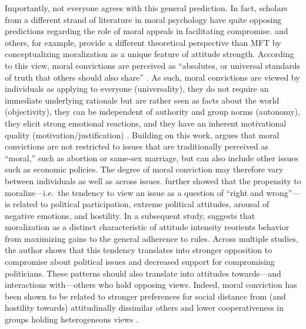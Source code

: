 Importantly, not everyone agrees with this general prediction. In fact, scholars from a different strand of literature in moral psychology have quite opposing predictions regarding the role of moral appeals in facilitating compromise. \citet{skitka2005moral} and others, for example, provide a different theoretical perspective than MFT by conceptualizing moralization as a unique feature of attitude strength. According to this view, moral convictions are perceived as ``absolutes, or universal standards of truth that others should also share'' \citep[269]{skitka2010psychology}. As such, moral convictions are viewed by individuals as applying to everyone (universality), they do not require an immediate underlying rationale but are rather seen as facts about the world (objectivity), they can be independent of authority and group norms (autonomy), they elicit strong emotional reactions, and they have an inherent motivational quality (motivation/justification) \citep{skitka2010psychology}. Building on this work, \citet{ryan2014reconsidering} argues that moral convictions are not restricted to issues that are traditionally perceived as ``moral,'' such as abortion or same-sex marriage, but can also include other issues such as economic policies. The degree of moral conviction may therefore vary between individuals as well as across issues. \citet{ryan2014reconsidering} further showed that the propensity to moralize---i.e.~the tendency to view an issue as a question of ``right and wrong''---is related to political participation, extreme political attitudes, arousal of negative emotions, and hostility. In a subsequent study, \citet{ryan2017no} suggests that moralization as a distinct characteristic of attitude intensity reorients behavior from maximizing gains to the general adherence to rules. Across multiple studies, the author shows that this tendency translates into stronger opposition to compromise about political issues and decreased support for compromising politicians. These patterns should also translate into attitudes towards---and interactions with---others who hold opposing views. Indeed, moral conviction has been shown to be related to stronger preferences for social distance from (and hostility towards) attitudinally dissimilar others and lower cooperativeness in groups holding heterogeneous views \citep{skitka2005moral}.

